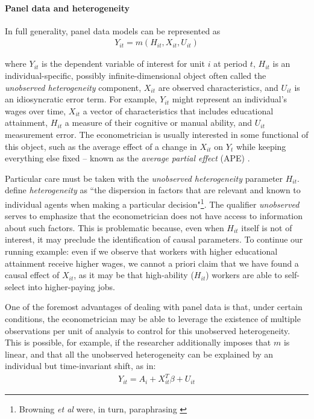 \paragraph{Panel data and heterogeneity} In full generality, panel data models can be represented as
\begin{align}
  Y_{it} = m(H_{it}, X_{it}, U_{it}) \label{eq:full_generality_panel}
\end{align}

\noindent where $Y_{it}$ is the dependent variable of interest for unit $i$ at period $t$, $H_{it}$ is an individual-specific, possibly infinite-dimensional object often called the \emph{unobserved heterogeneity} component, $X_{it}$ are observed characteristics, and $U_{it}$ is an idiosyncratic error term.  For example, $Y_{it}$ might represent an individual's wages over time, $X_{it}$ a vector of characteristics that includes educational attainment, $H_{it}$ a measure of their cognitive or manual ability, and $U_{it}$ measurement error. The econometrician is usually interested in some functional of this object, such as the average effect of a change in $X_{it}$ on $Y_{t}$ while keeping everything else fixed -- known as the \emph{average partial effect} (APE) \citet{blundell2003endogeneity}. 

Particular care must be taken with the \emph{unobserved heterogeneity} parameter $H_{it}$. \citet[~p.2]{browning2007heterogeneity} define \emph{heterogeneity} as ``the dispersion in factors that are relevant and known to individual agents when making a particular decision"\footnote{Browning \textit{et al} were, in turn, paraphrasing \cite{cunha2005separating}}. The qualifier \emph{unobserved} serves to emphasize that the econometrician does not have access to information about such factors. This is problematic because, even when $H_{it}$ itself is not of interest, it may preclude the identification of causal parameters. To continue our running example: even if we observe that workers with higher educational attainment receive higher wages, we cannot a priori claim that we have found a causal effect of $X_{it}$, as it may be that high-ability ($H_{it}$) workers are able to self-select into higher-paying jobs.

One of the foremost advantages of dealing with panel data is that, under certain conditions, the econometrician may be able to leverage the existence of multiple observations per unit of analysis to control for this unobserved heterogeneity. This is possible, for example, if the researcher additionally imposes that $m$ is linear, and that all the unobserved heterogeneity can be explained by an individual but time-invariant shift, as in:
\begin{align}
  Y_{it} = A_{i} + X_{it}^{T}\beta + U_{it}
\end{align}


